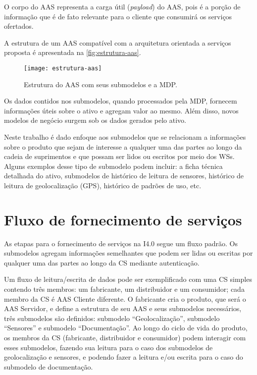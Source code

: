	O corpo do AAS representa a carga útil (\textit{payload}) do AAS, pois é a porção de informação que é de fato relevante para o cliente que consumirá os serviços ofertados.
	
	A estrutura de um AAS compatível com a arquitetura orientada a serviços proposta é apresentada na \autoref{fig:estrutura-aas}.
	
	\begin{figure}[htb]
		\centering
		\caption{Estrutura do AAS com seus submodelos e a MDP.}
		\label{fig:estrutura-aas}
		\texttt{[image: estrutura-aas]}
	\end{figure}

	Os dados contidos nos submodelos, quando processados pela MDP, fornecem informações úteis sobre o ativo e agregam valor ao mesmo. Além disso, novos modelos de negócio surgem sob os dados gerados pelo ativo.
	
	Neste trabalho é dado enfoque aos submodelos que se relacionam a informações sobre o produto que sejam de interesse a qualquer uma das partes ao longo da cadeia de suprimentos e que possam ser lidos ou escritos por meio dos WSs. Alguns exemplos desse tipo de submodelo podem incluir: a ficha técnica detalhada do ativo, submodelos de histórico de leitura de sensores, histórico de leitura de geolocalização (GPS), histórico de padrões de uso, etc.


\section{Fluxo de fornecimento de serviços}

	As etapas para o fornecimento de serviços na I4.0 segue um fluxo padrão. Os submodelos agregam informações semelhantes que podem ser lidas ou escritas por qualquer uma das partes ao longo da CS mediante autenticação.
	
	Um fluxo de leitura/escrita de dados pode ser exemplificado com uma CS simples contendo três membros: um fabricante, um distribuidor e um consumidor; cada membro da CS é AAS Cliente diferente. O fabricante cria o produto, que será o AAS Servidor, e define a estrutura de seu AAS e seus submodelos necessários, três submodelos são definidos: submodelo ``Geolocalização'', submodelo ``Sensores'' e submodelo ``Documentação''. Ao longo do ciclo de vida do produto, os membros da CS (fabricante, distribuidor e consumidor) podem interagir com esses submodelos, fazendo sua leitura para o caso dos submodelos de geolocalização e sensores, e podendo fazer a leitura e/ou escrita para o caso do submodelo de documentação.
	
